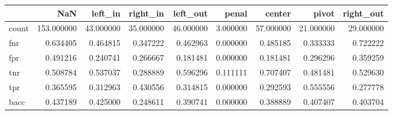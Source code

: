 \begin{tabular}{lrrrrrrrr}
\toprule
{} &         NaN &    left\_in &   right\_in &   left\_out &     penal &     center &      pivot &  right\_out \\
\midrule
count &  153.000000 &  43.000000 &  35.000000 &  46.000000 &  3.000000 &  57.000000 &  21.000000 &  29.000000 \\
fnr   &    0.634405 &   0.464815 &   0.347222 &   0.462963 &  0.000000 &   0.485185 &   0.333333 &   0.722222 \\
fpr   &    0.491216 &   0.240741 &   0.266667 &   0.181481 &  0.000000 &   0.181481 &   0.296296 &   0.359259 \\
tnr   &    0.508784 &   0.537037 &   0.288889 &   0.596296 &  0.111111 &   0.707407 &   0.481481 &   0.529630 \\
tpr   &    0.365595 &   0.312963 &   0.430556 &   0.314815 &  0.000000 &   0.292593 &   0.555556 &   0.277778 \\
bacc  &    0.437189 &   0.425000 &   0.248611 &   0.390741 &  0.000000 &   0.388889 &   0.407407 &   0.403704 \\
\bottomrule
\end{tabular}
